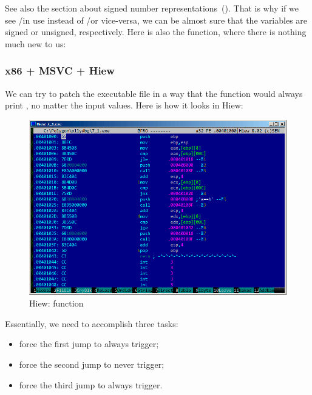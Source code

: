 See also the section about signed number representations~().
That is why if we see \JG/\JL in use instead of \JA/\JB or vice-versa, 
we can be almost sure that the variables are signed or unsigned, respectively.
Here is also the \main function, where there is nothing much new to us:





\clearpage
\subsubsection{x86 + MSVC + Hiew}

We can try to patch the executable file in a way 
that the  function would always print , 
no matter the input values.
Here is how it looks in Hiew:

\begin{figure}[H]
\centering
\includegraphics[scale=\FigScale]{patterns/07_jcc/simple/hiew_unsigned1.png}
\caption{Hiew:  function}
\label{fig:jcc_hiew_1}
\end{figure}

Essentially, we need to accomplish three tasks:
\begin{itemize}
\item force the first jump to always trigger;
\item force the second jump to never trigger;
\item force the third jump to always trigger.
\end{itemize}

